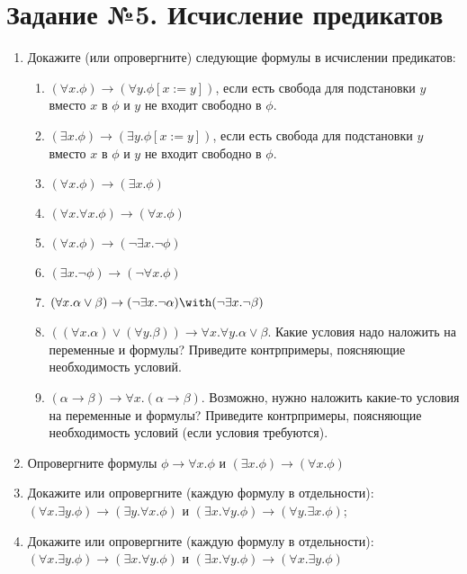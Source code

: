\documentclass[10pt,a4paper,oneside]{article}
\begin{document}
\section*{Задание №5. Исчисление предикатов}

\begin{enumerate}
\item Докажите (или опровергните) следующие формулы в исчислении предикатов:
\begin{enumerate}
\item $(\forall x.\phi)\rightarrow (\forall y.\phi[x := y])$, если есть свобода для подстановки $y$ вместо $x$ в $\phi$ и $y$ не входит свободно в $\phi$.
\item $(\exists x.\phi)\rightarrow (\exists y.\phi[x := y])$, если есть свобода для подстановки $y$ вместо $x$ в $\phi$ и $y$ не входит свободно в $\phi$.
\item $(\forall x.\phi)\rightarrow (\exists x.\phi)$
\item $(\forall x.\forall x.\phi) \rightarrow (\forall x.\phi)$
\item $(\forall x.\phi) \rightarrow (\neg \exists x.\neg \phi)$ 
\item $(\exists x.\neg\phi) \rightarrow (\neg \forall x.\phi)$
\item $(\forall x.\alpha\vee\beta) \rightarrow (\neg \exists x.\neg \alpha) \with (\neg \exists x.\neg\beta)$
\item $((\forall x.\alpha) \vee (\forall y.\beta)) \rightarrow \forall x.\forall y.\alpha\vee\beta$. Какие условия
надо наложить на переменные и формулы? Приведите контрпримеры, поясняющие необходимость условий.
\item $(\alpha\rightarrow\beta) \rightarrow \forall x.(\alpha\rightarrow\beta)$. Возможно, нужно наложить
какие-то условия на переменные и формулы? Приведите контрпримеры, поясняющие необходимость условий (если 
условия требуются).
\end{enumerate}

\item Опровергните формулы $\phi\rightarrow\forall x.\phi$ и $(\exists x.\phi)\rightarrow (\forall x.\phi)$

\item Докажите или опровергните (каждую формулу в отдельности): $(\forall x.\exists y.\phi) \rightarrow (\exists y.\forall x.\phi)$ и
$(\exists x.\forall y.\phi) \rightarrow (\forall y.\exists x.\phi)$;
\item Докажите или опровергните (каждую формулу в отдельности): $(\forall x.\exists y.\phi) \rightarrow (\exists x.\forall y.\phi)$ и
$(\exists x.\forall y.\phi) \rightarrow (\forall x.\exists y.\phi)$


\end{enumerate}
\end{document}
